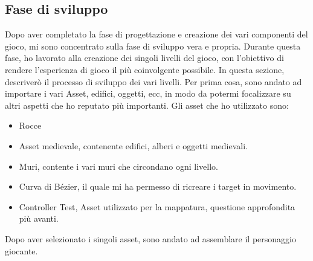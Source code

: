 \documentclass[
a4paper,
cleardoublepage=empty,
headings=twolinechapter,
numbers=autoenddot,
]{scrbook}
\begin{document}
    \subsection{Fase di sviluppo}
    Dopo aver completato la fase di progettazione e creazione dei vari componenti del gioco, mi sono concentrato sulla fase di sviluppo vera e propria. Durante questa fase, ho lavorato alla creazione dei singoli livelli del gioco, con l'obiettivo di rendere l'esperienza di gioco il più coinvolgente possibile. In questa sezione, descriverò il processo di sviluppo dei vari livelli.
    Per prima cosa, sono andato ad importare i vari Asset, edifici, oggetti, ecc, in modo da potermi focalizzare su altri aspetti che ho reputato più importanti.
    Gli asset che ho utilizzato sono:
    \begin{itemize}
    	\item Rocce\cite{Rock_asset}
    	\item Asset medievale\cite{Pack_asset}, contenente edifici, alberi e oggetti medievali. 
    	\item Muri\cite{Wall_asset}, contente i vari muri che circondano ogni livello.
    	\item Curva di Bézier\cite{Pack_asset}, il quale mi ha permesso di ricreare i target in movimento.
    	\item Controller Test\cite{Controller_test}, Asset utilizzato per la mappatura, questione approfondita più avanti.
    \end{itemize}
    Dopo aver selezionato i singoli asset, sono andato ad assemblare il personaggio giocante.
\end{document}
